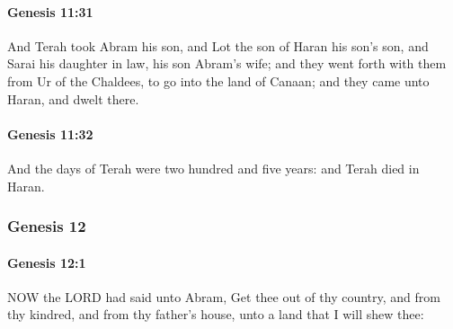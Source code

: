 		\paragraph{Genesis 11:31} %
			\label{GENESIS-11-31}

			And Terah took Abram his son, and Lot the son of Haran his son's son, and Sarai his daughter in law, his son Abram's wife; and they went forth with them from Ur of the Chaldees, to go into the land of Canaan; and they came unto Haran, and dwelt there.


		\paragraph{Genesis 11:32} %
			\label{GENESIS-11-32}

			And the days of Terah were two hundred and five years: and Terah died in Haran.


	\subsubsection{Genesis 12} %
		\label{GENESIS-12}
		
		\paragraph{Genesis 12:1} %
			\label{GENESIS-12-1}

			NOW the LORD had said unto Abram, Get thee out of thy country, and from thy kindred, and from thy father's house, unto a land that I will shew thee:

